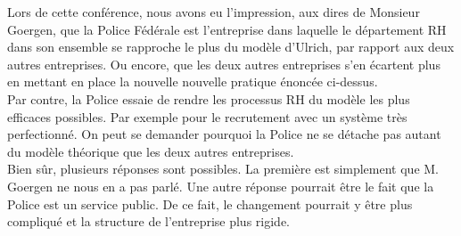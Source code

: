 Lors de cette conférence, nous avons eu l'impression, aux dires de Monsieur Goergen, que la Police Fédérale est l'entreprise dans laquelle le département RH dans son ensemble se rapproche le plus du modèle d'Ulrich, par rapport aux deux autres entreprises. Ou encore, que les deux autres entreprises s'en écartent plus en mettant en place la nouvelle nouvelle pratique énoncée ci-dessus.\\
Par contre, la Police essaie de rendre les processus RH du modèle les plus efficaces possibles. Par exemple pour le recrutement avec un système très perfectionné. On peut se demander pourquoi la Police ne se détache pas autant du modèle théorique que les deux autres entreprises.\\
Bien sûr, plusieurs réponses sont possibles. La première est simplement que M. Goergen ne nous en a pas parlé. Une autre réponse pourrait être le fait que la Police est un service public. De ce fait, le changement pourrait y être plus compliqué et la structure de l'entreprise plus rigide.\newline